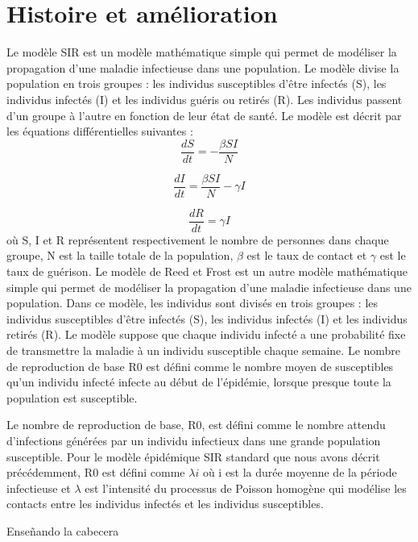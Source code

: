 \documentclass[11pt]{report}
\begin{document}
        \section{Histoire et amélioration}

	Le modèle SIR est un modèle mathématique simple qui permet de modéliser la propagation d'une maladie infectieuse dans une population. Le modèle divise la population en trois groupes : les individus susceptibles d'être infectés (S), les individus infectés (I) et les individus guéris ou retirés (R). Les individus passent d'un groupe à l'autre en fonction de leur état de santé. Le modèle est décrit par les équations différentielles suivantes :
$$\frac{dS}{dt} = -\frac{\beta SI}{N}$$

$$\frac{dI}{dt} = \frac{\beta SI}{N} - \gamma I$$

$$\frac{dR}{dt} = \gamma I$$
où S, I et R représentent respectivement le nombre de personnes dans chaque groupe, N est la taille totale de la population, $\beta$ est le taux de contact et $\gamma$ est le taux de guérison. Le modèle de Reed et Frost est un autre modèle mathématique simple qui permet de modéliser la propagation d'une maladie infectieuse dans une population. Dans ce modèle, les individus sont divisés en trois groupes : les individus susceptibles d'être infectés (S), les individus infectés (I) et les individus retirés (R). Le modèle suppose que chaque individu infecté a une probabilité fixe de transmettre la maladie à un individu susceptible chaque semaine. Le nombre de reproduction de base R0 est défini comme le nombre moyen de susceptibles qu'un individu infecté infecte au début de l'épidémie, lorsque presque toute la population est susceptible.

Le nombre de reproduction de base, R0, est défini comme le nombre attendu d'infections générées par un individu infectieux dans une grande population susceptible. Pour le modèle épidémique SIR standard que nous avons décrit précédemment, R0 est défini comme $\lambda i$ où i est la durée moyenne de la période infectieuse et $\lambda$ est l'intensité du processus de Poisson homogène qui modélise les contacts entre les individus infectés et les individus susceptibles.


            \newpage Enseñando la cabecera
		
            
            
 

\setlength{\abovedisplayskip}{6pt}
\setlength{\belowdisplayskip}{6pt}






	






 \listoffigures
\listoftables      
\renewcommand{\bibname}{Bibliography}





\end{document}
